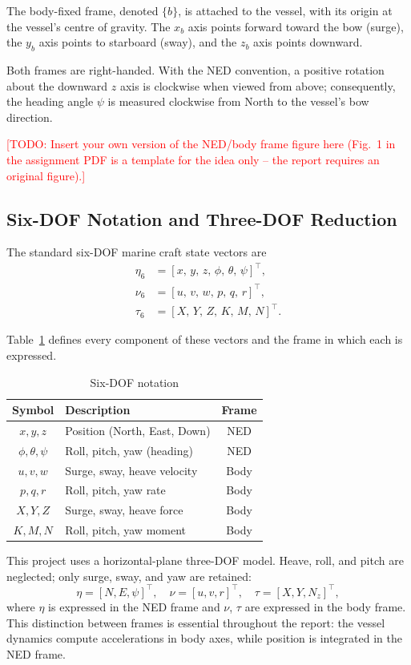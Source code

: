 \documentclass[10pt,conference]{IEEEtran}
\newcommand{\todo}[1]{\textcolor{red}{[TODO: #1]}}
\begin{document}
The body-fixed frame, denoted $\{b\}$, is attached to the vessel, with
its origin at the vessel's centre of gravity. The $x_b$ axis points
forward toward the bow (surge), the $y_b$ axis points to starboard
(sway), and the $z_b$ axis points downward.

Both frames are right-handed. With the NED convention, a positive
rotation about the downward $z$ axis is clockwise when viewed from
above; consequently, the heading angle $\psi$ is measured clockwise
from North to the vessel's bow direction.

\todo{Insert your own version of the NED/body frame figure here
(Fig.~1 in the assignment PDF is a template for the idea only --
the report requires an original figure).}

\subsection{Six-DOF Notation and Three-DOF Reduction}

The standard six-DOF marine craft state vectors are
\begin{align}
\eta_6 &= [x,\, y,\, z,\, \phi,\, \theta,\, \psi]^\top, \\
\nu_6 &= [u,\, v,\, w,\, p,\, q,\, r]^\top, \\
\tau_6 &= [X,\, Y,\, Z,\, K,\, M,\, N]^\top.
\end{align}

Table~\ref{tab:notation} defines every component of these vectors and
the frame in which each is expressed.

\begin{table}[htbp]
\centering
\caption{Six-DOF notation}
\label{tab:notation}
\begin{tabular}{@{}clc@{}}
\toprule
Symbol & Description & Frame \\
\midrule
$x, y, z$ & Position (North, East, Down) & NED \\
$\phi, \theta, \psi$ & Roll, pitch, yaw (heading) & NED \\
$u, v, w$ & Surge, sway, heave velocity & Body \\
$p, q, r$ & Roll, pitch, yaw rate & Body \\
$X, Y, Z$ & Surge, sway, heave force & Body \\
$K, M, N$ & Roll, pitch, yaw moment & Body \\
\bottomrule
\end{tabular}
\end{table}

This project uses a horizontal-plane three-DOF model. Heave, roll,
and pitch are neglected; only surge, sway, and yaw are retained:
\begin{equation}
\eta = [N, E, \psi]^\top, \quad
\nu = [u, v, r]^\top, \quad
\tau = [X, Y, N_z]^\top,
\end{equation}
where $\eta$ is expressed in the NED frame and $\nu$, $\tau$ are
expressed in the body frame. This distinction between frames is
essential throughout the report: the vessel dynamics compute
accelerations in body axes, while position is integrated in the NED
frame.
\end{document}
